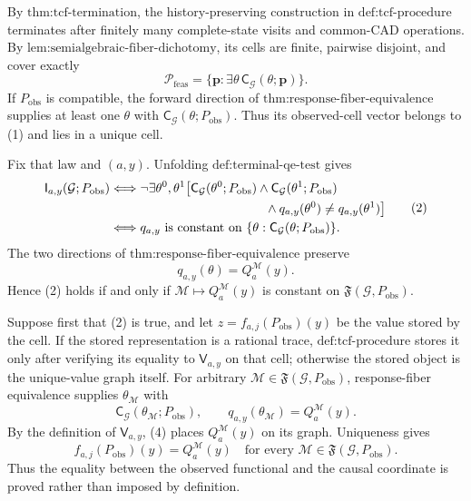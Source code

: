 By \(\text{thm:tcf-termination}\), the history-preserving construction in \(\text{def:tcf-procedure}\) terminates after finitely many complete-state visits and common-CAD operations. By \(\text{lem:semialgebraic-fiber-dichotomy}\), its cells are finite, pairwise disjoint, and cover exactly
\[
\mathcal P_{\mathrm{feas}}
=\{\mathbf p:\exists\theta\,\mathsf C_{\mathcal G}(\theta;\mathbf p)\}.
\tag{1}
\]
If \(P_{\mathrm{obs}}\) is compatible, the forward direction of \(\text{thm:response-fiber-equivalence}\) supplies at least one \(\theta\) with \(\mathsf C_{\mathcal G}(\theta;P_{\mathrm{obs}})\). Thus its observed-cell vector belongs to (1) and lies in a unique cell.

Fix that law and \((a,y)\). Unfolding \(\text{def:terminal-qe-test}\) gives
\[
\begin{aligned}
\mathsf I_{a,y}(\mathcal G;P_{\mathrm{obs}})
&\Longleftrightarrow
\neg\exists\theta^0,\theta^1\bigl[
\mathsf C_{\mathcal G}(\theta^0;P_{\mathrm{obs}})
\wedge\mathsf C_{\mathcal G}(\theta^1;P_{\mathrm{obs}})\\
&\hspace{43mm}\wedge q_{a,y}(\theta^0)\neq q_{a,y}(\theta^1)
\bigr]\\
&\Longleftrightarrow
q_{a,y}\text{ is constant on }
\{\theta:\mathsf C_{\mathcal G}(\theta;P_{\mathrm{obs}})\}.
\end{aligned}
\tag{2}
\]
The two directions of \(\text{thm:response-fiber-equivalence}\) preserve
\[
q_{a,y}(\theta)=Q_a^{\mathcal M}(y).
\tag{3}
\]
Hence (2) holds if and only if \(\mathcal M\mapsto Q_a^{\mathcal M}(y)\) is constant on \(\mathfrak F(\mathcal G,P_{\mathrm{obs}})\).

Suppose first that (2) is true, and let \(z=f_{a,j}(P_{\mathrm{obs}})(y)\) be the value stored by the cell. If the stored representation is a rational trace, \(\text{def:tcf-procedure}\) stores it only after verifying its equality to \(\mathsf V_{a,y}\) on that cell; otherwise the stored object is the unique-value graph itself. For arbitrary \(\mathcal M\in\mathfrak F(\mathcal G,P_{\mathrm{obs}})\), response-fiber equivalence supplies \(\theta_{\mathcal M}\) with
\[
\mathsf C_{\mathcal G}(\theta_{\mathcal M};P_{\mathrm{obs}}),
\qquad
q_{a,y}(\theta_{\mathcal M})=Q_a^{\mathcal M}(y).
\tag{4}
\]
By the definition of \(\mathsf V_{a,y}\), (4) places \(Q_a^{\mathcal M}(y)\) on its graph. Uniqueness gives
\[
f_{a,j}(P_{\mathrm{obs}})(y)=Q_a^{\mathcal M}(y)
\quad\text{for every }\mathcal M\in\mathfrak F(\mathcal G,P_{\mathrm{obs}}).
\tag{5}
\]
Thus the equality between the observed functional and the causal coordinate is proved rather than imposed by definition.

